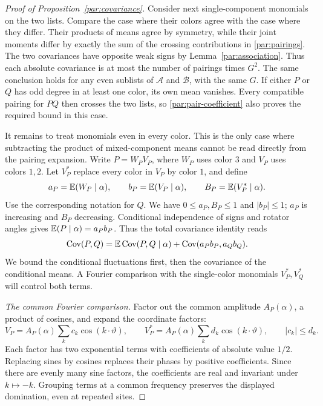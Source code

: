 \begin{proof}[Proof of Proposition~\ref{par:covariance}]
Consider next single-component monomials on the two lists. Compare the
case where their colors agree with the case where they differ. Their
products of means agree by symmetry, while their joint moments differ
by exactly the sum of the crossing contributions in
\eqref{par:pairings}. The two covariances have opposite weak signs by
Lemma~\ref{par:association}. Thus each absolute covariance is at most
the number of pairings times $G^2$. The same conclusion holds for any
even sublists of $\mathcal A$ and $\mathcal B$, with the same $G$.
If either $P$ or $Q$ has odd degree in at least one color, its own mean
vanishes. Every compatible pairing for $PQ$ then crosses the two lists,
so \eqref{par:pair-coefficient} also proves the required bound in this case.

It remains to treat monomials even in every color. This is the only case
where subtracting the product of mixed-component means cannot be read
directly from the pairing expansion. Write $P=W_PV_P$, where $W_P$ uses
color $3$ and $V_P$ uses colors $1,2$. Let $V_P^*$ replace every color in
$V_P$ by color $1$, and define
\[
 a_P=\mathbb E(W_P\mid\alpha),\qquad
 b_P=\mathbb E(V_P\mid\alpha),\qquad
 B_P=\mathbb E(V_P^*\mid\alpha).
\]
Use the corresponding notation for $Q$. We have $0\le a_P,B_P\le1$
and $|b_P|\le1$; $a_P$ is increasing and $B_P$ decreasing.
Conditional independence of signs and rotator angles gives
$\mathbb E(P\mid\alpha)=a_Pb_P$. Thus the total covariance identity reads
\begin{equation}\label{par:total-covariance}
 \operatorname{Cov}(P,Q)=\mathbb E\operatorname{Cov}(P,Q\mid\alpha)
                    +\operatorname{Cov}(a_Pb_P,a_Qb_Q).
\end{equation}
We bound the conditional fluctuations first, then the covariance of the
conditional means. A Fourier comparison with the single-color monomials
$V_P^*,V_Q^*$ will control both terms.

\emph{The common Fourier comparison.}
Factor out the common amplitude $A_P(\alpha)$, a product of cosines,
and expand the coordinate factors:
\begin{equation}\label{par:fourier-domination}
 V_P=A_P(\alpha)\sum_k c_k\cos(k\cdot\vartheta),
 \qquad
 V_P^*=A_P(\alpha)\sum_k d_k\cos(k\cdot\vartheta),
 \qquad |c_k|\le d_k.
\end{equation}
Each factor has two exponential terms with coefficients of absolute
value $1/2$. Replacing sines by cosines replaces their phases by positive
coefficients. Since there are evenly many sine factors, the coefficients
are real and invariant under $k\mapsto-k$. Grouping terms at a common
frequency preserves the displayed domination, even at repeated sites.


\end{proof}

